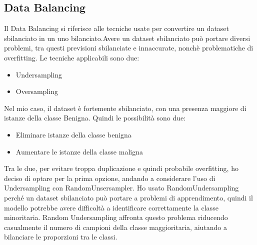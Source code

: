 \documentclass{article}
\begin{document}
\subsection{Data Balancing}
Il Data Balancing si riferisce alle tecniche usate per convertire un dataset sbilanciato in un uno bilanciato.Avere un dataset sbilanciato può portare diversi problemi, tra questi previsioni sbilanciate e
innaccurate, nonchè problematiche di overfitting. Le tecniche applicabili sono due:
\begin{itemize}
    \item Undersampling
    \item Oversampling
\end{itemize}
Nel mio caso, il dataset è fortemente sbilanciato, con una presenza maggiore di istanze della classe Benigna. Quindi le possibilità sono due:
\begin{itemize}
    \item Eliminare istanze della classe benigna
    \item Aumentare le istanze della classe maligna
\end{itemize}
Tra le due, per evitare troppa duplicazione e quindi probabile overfitting, ho deciso di optare per la prima opzione, andando a considerare l’uso di Undersampling con RandomUnsersampler. Ho usato RandomUndersampling perché un dataset sbilanciato può portare a problemi di apprendimento, quindi il modello potrebbe avere difficoltà a identificare correttamente la classe minoritaria. Random Undersampling affronta questo problema riducendo casualmente il numero di campioni della classe maggioritaria, aiutando a bilanciare le proporzioni tra le classi.
\end{document}
